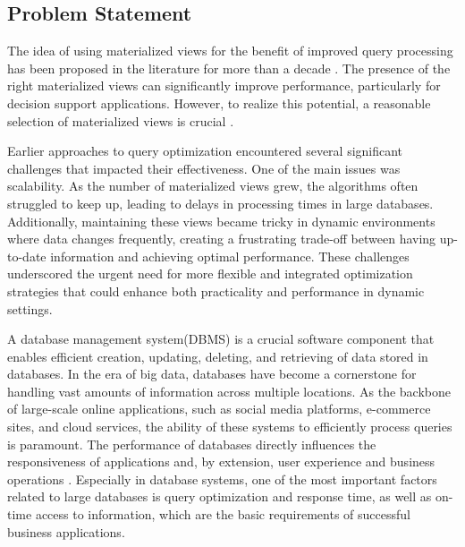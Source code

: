 \subsection{Problem Statement}
The idea of using materialized views for the benefit of improved query processing has been proposed in the literature for more than a decade \cite{Blakeley1986EfficientlyUM}. The presence of the right materialized views can significantly improve performance, particularly for decision support applications. However, to realize this potential, a reasonable selection of materialized views is crucial \cite{agrawal2000automated}.\vspace{.3cm}

Earlier approaches to query optimization encountered several significant challenges that impacted their effectiveness. One of the main issues was scalability. As the number of materialized views grew, the algorithms often struggled to keep up, leading to delays in processing times in large databases. Additionally, maintaining these views became tricky in dynamic environments where data changes frequently, creating a frustrating trade-off between having up-to-date information and achieving optimal performance. These challenges underscored the urgent need for more flexible and integrated optimization strategies that could enhance both practicality and performance in dynamic settings.\vspace{.3cm}

A database management system(DBMS) is a crucial software component that enables efficient creation, updating, deleting, and retrieving of data stored in databases. In the era of big data, databases have become a cornerstone for handling vast amounts of information across multiple locations. As the backbone of large-scale online applications, such as social media platforms, e-commerce sites, and cloud services, the ability of these systems to efficiently process queries is paramount. The performance of databases directly influences the responsiveness of applications and, by extension, user experience and business operations \cite{4}. Especially in database systems, one of the most important factors related to large databases is query optimization and response time, as well as on-time access to information, which are the basic requirements of successful business applications.\vspace{.3cm}

